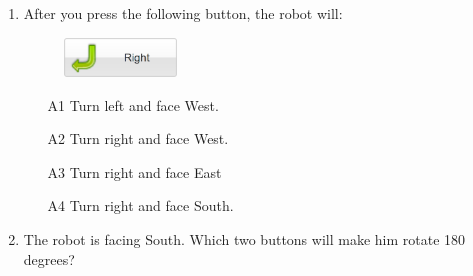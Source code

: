 \begin{enumerate}
\item After you press the following button, the robot will:

\begin{figure}[!ht]
\begin{center}
\includegraphics[width=3cm]{img/button-right-4.png}
\end{center}
\end{figure}
\begin{enumerate}
\item[A1] Turn left and face West.
\item[A2] Turn right and face West.
\item[A3] Turn right and face East
\item[A4] Turn right and face South.
\end{enumerate}
\newpage
\item The robot is facing South. Which two buttons will make him rotate 180 degrees?


\end{enumerate}
